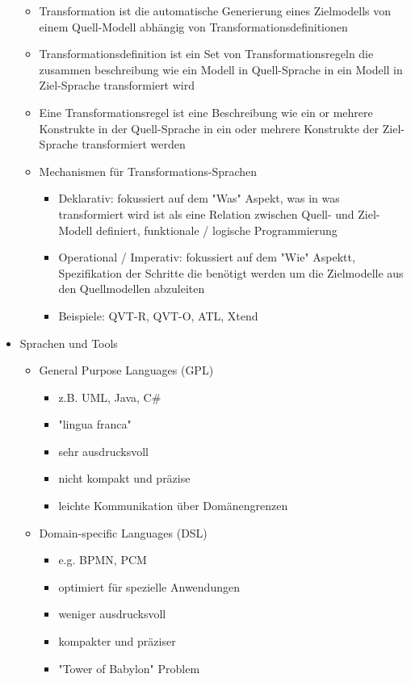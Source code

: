 \documentclass[paper=a4, fontsize=11pt]{scrartcl} %
\numberwithin{equation}{section} %
\numberwithin{figure}{section} %
\numberwithin{table}{section} %
\begin{document}
\begin{itemize}
\begin{itemize}
    \item Transformation ist die automatische Generierung eines Zielmodells von einem Quell-Modell abhängig von Transformationsdefinitionen
    \item Transformationsdefinition ist ein Set von Transformationsregeln die zusammen beschreibung wie ein Modell in Quell-Sprache in ein Modell in Ziel-Sprache transformiert wird
    \item Eine Transformationsregel ist eine Beschreibung wie ein or mehrere Konstrukte in der Quell-Sprache in ein oder mehrere Konstrukte der Ziel-Sprache transformiert werden
    \item Mechanismen für Transformations-Sprachen
    \begin{itemize}
      \item Deklarativ: fokussiert auf dem "Was" Aspekt, was in was transformiert wird ist als eine Relation zwischen Quell- und Ziel-Modell definiert, funktionale / logische Programmierung
      \item Operational / Imperativ: fokussiert auf dem "Wie" Aspektt, Spezifikation der Schritte die benötigt werden um die Zielmodelle aus den Quellmodellen abzuleiten
      \item Beispiele: QVT-R, QVT-O, ATL, Xtend
    \end{itemize}
  \end{itemize}
  \item Sprachen und Tools
  \begin{itemize}
    \item General Purpose Languages (GPL)
    \begin{itemize}
      \item z.B. UML, Java, C\#
      \item "lingua franca"
      \item sehr ausdrucksvoll
      \item nicht kompakt und präzise
      \item leichte Kommunikation über Domänengrenzen
    \end{itemize}
    \item Domain-specific Languages (DSL)
    \begin{itemize}
      \item e.g. BPMN, PCM
      \item optimiert für spezielle Anwendungen
      \item weniger ausdrucksvoll
      \item kompakter und präziser
      \item "Tower of Babylon" Problem

\end{itemize}
\end{itemize}
\end{itemize}
\end{document}
